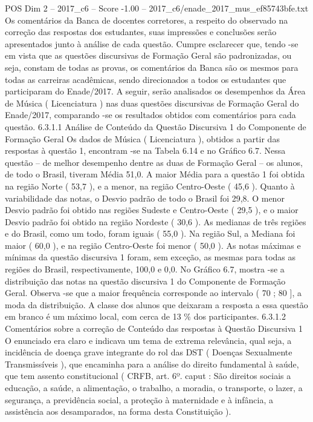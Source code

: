 \begin{textsample}{POS Dim 2 – 2017\_c6 – Score -1.00 – 2017\_c6/enade\_2017\_mus\_ef85743bfe.txt}
Os comentários da Banca de docentes corretores, a respeito do observado na correção das respostas dos estudantes, suas impressões e conclusões serão apresentados junto à análise de cada questão.
Cumpre esclarecer que, tendo -se em vista que as questões discursivas de Formação Geral são padronizadas, ou seja, constam de todas as provas, os comentários da Banca são os mesmos para todas as carreiras acadêmicas, sendo direcionados a todos os estudantes que participaram do Enade/2017.
A seguir, serão analisados os desempenhos da Área de Música ( Licenciatura ) nas duas questões discursivas de Formação Geral do Enade/2017, comparando -se os resultados obtidos com comentários para cada questão. 6.3.1.1 Análise de Conteúdo da Questão Discursiva 1 do Componente de Formação Geral Os dados de Música ( Licenciatura ), obtidos a partir das respostas à questão 1, encontram -se na Tabela 6.14 e no Gráfico 6.7.
Nessa questão – de melhor desempenho dentre as duas de Formação Geral – os alunos, de todo o Brasil, tiveram Média 51,0.
A maior Média para a questão 1 foi obtida na região Norte ( 53,7 ), e a menor, na região Centro-Oeste ( 45,6 ).
Quanto à variabilidade das notas, o Desvio padrão de todo o Brasil foi 29,8.
O menor Desvio padrão foi obtido nas regiões Sudeste e Centro-Oeste ( 29,5 ), e o maior Desvio padrão foi obtido na região Nordeste ( 30,6 ).
As medianas de três regiões e do Brasil, como um todo, foram iguais ( 55,0 ).
Na região Sul, a Mediana foi maior ( 60,0 ), e na região Centro-Oeste foi menor ( 50,0 ).
As notas máximas e mínimas da questão discursiva 1 foram, sem exceção, as mesmas para todas as regiões do Brasil, respectivamente, 100,0 e 0,0.
No Gráfico 6.7, mostra -se a distribuição das notas na questão discursiva 1 do Componente de Formação Geral.
Observa -se que a maior frequência corresponde ao intervalo ( 70 ; 80 ], a moda da distribuição.
A classe dos alunos que deixaram a resposta a essa questão em branco é um máximo local, com cerca de 13 \% dos participantes. 6.3.1.2 Comentários sobre a correção de Conteúdo das respostas à Questão Discursiva 1 O enunciado era claro e indicava um tema de extrema relevância, qual seja, a incidência de doença grave integrante do rol das DST ( Doenças Sexualmente Transmissíveis ), que encaminha para a análise do direito fundamental à saúde, que tem assento constitucional ( CRFB, art. 6º. caput : São direitos sociais a educação, a saúde, a alimentação, o trabalho, a moradia, o transporte, o lazer, a segurança, a previdência social, a proteção à maternidade e à infância, a assistência aos desamparados, na forma desta Constituição ).

\end{textsample}
